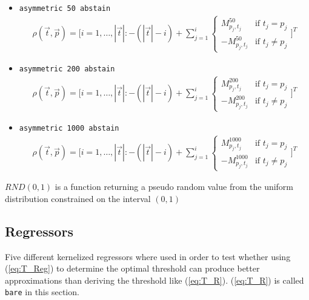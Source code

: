 \documentclass[twoside,11pt]{article}
\begin{document}
\begin{itemize}
  \item \texttt{asymmetric 50 abstain}
    \begin{align*}
      \rho(\vec{t}, \vec{p}) = \Bigg[
      i=1,\dots,|\vec{t}|: -(|\vec{t}| - i)+\sum_{j=1}^{i}
      \begin{cases}
        M^{50}_{p_j,t_j}  &\text{if } t_j = p_j \\
        -M^{50}_{p_j,t_j} &\text{if } t_j \neq p_j
      \end{cases} \Bigg]^T
    \end{align*}

  \item \texttt{asymmetric 200 abstain}
    \begin{align*}
      \rho(\vec{t}, \vec{p}) = \Bigg[
      i=1,\dots,|\vec{t}|: -(|\vec{t}| - i)+\sum_{j=1}^{i}
      \begin{cases}
        M^{200}_{p_j,t_j}  &\text{if } t_j = p_j \\
        -M^{200}_{p_j,t_j} &\text{if } t_j \neq p_j
      \end{cases} \Bigg]^T
    \end{align*}

  \item \texttt{asymmetric 1000 abstain}
    \begin{align*}
      \rho(\vec{t}, \vec{p}) = \Bigg[
      i=1,\dots,|\vec{t}|: -(|\vec{t}| - i)+\sum_{j=1}^{i}
      \begin{cases}
        M^{1000}_{p_j,t_j}  &\text{if } t_j = p_j \\
        -M^{1000}_{p_j,t_j} &\text{if } t_j \neq p_j
      \end{cases} \Bigg]^T
    \end{align*}

\end{itemize}

$RND(0,1)$ is a function returning a pseudo random value
from the uniform distribution constrained on the interval
$(0,1)$


\subsection{Regressors}

Five different kernelized regressors where used in order
to test whether using (\ref{eq:T_Reg}) to determine the
optimal threshold can produce better approximations than
deriving the threshold like (\ref{eq:T_R}).
(\ref{eq:T_R}) is called \texttt{bare} in this section.
\end{document}
